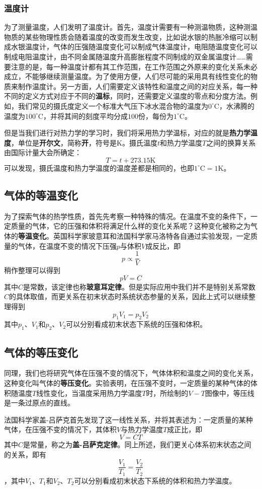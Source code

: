 \subsubsection{温度计}
为了测量温度，人们发明了温度计。首先，温度计需要有一种测温物质，这种测温物质的某些物理性质会随着温度的改变而发生改变，比如说水银的热胀冷缩可以制成水银温度计，气体的压强随温度变化可以制成气体温度计，电阻随温度变化可以制成电阻温度计，由不同金属随温度升高膨胀程度不同制成的双金属温度计……需要注意的是，每一种温度计都有其工作范围，在工作范围之外原来的变化关系未必成立，不能够继续测量温度。为了使用方便，人们尽可能的采用具有线性变化的物质来制作温度计。另一方面，人们需要定义该特性和温度之间的对应关系，每一种不同的定义方式对应于不同的\textbf{温标}，同时，还需要定义温度的零点和分度方法。例如，我们常见的摄氏度定义一个标准大气压下冰水混合物的温度为$0^\circ \mathrm{C}$，水沸腾的温度为$100^\circ \mathrm{C}$，并将其间的刻度平均分成$100$份，每份为$1^\circ \mathrm{C}$。

但是当我们进行对热力学的学习时，我们将采用热力学温标，对应的就是\textbf{热力学温度}，单位是\textbf{开尔文}，简称\textbf{开}，符号是$\mathrm{K}$。摄氏温度$t$和热力学温度$T$之间的换算关系由国际计量大会所确定：$$T=t+273.15\mathrm{K}$$可以发现，摄氏温度和热力学温度的温度差都是相同的，也即$1^\circ \mathrm{C}=1\mathrm{K}$。

\subsection{气体的等温变化}
为了探索气体的热学性质，首先先考察一种特殊的情况。在温度不变的条件下，一定质量的气体，它的压强和体积将满足什么样的变化关系呢？这种变化被称之为气体的\textbf{等温变化}。英国科学家玻意耳和法国科学家马洛特各自通过实验发现，一定质量的气体，在温度不变的情况下压强$p$与体积$V$成反比，即$$p\propto\dfrac{1}{V}$$稍作整理可以得到$$pV=C$$其中$C$是常数，该定律也称\textbf{玻意耳定律}。但是实际应用中我们并不是特别关系常数$C$的具体取值，而更关系在初末状态时系统状态参量的关系，因此上式可以继续整理得到$$p_1V_1=p_2V_2$$其中$p_1$、$V_1$和$p_2$、$V_2$可以分别看成初末状态下系统的压强和体积。
\subsection{气体的等压变化}
同理，我们也将研究气体在压强不变的情况下，气体体积和温度之间的变化关系，这种变化叫气体的\textbf{等压变化}。实验表明，在压强不变时，一定质量的某种气体的体积随温度$T$线性变化，当温度采用热力学温度$T$时，所绘制的$V-T$图像中，等压线是一条过原点的直线。

法国科学家盖-吕萨克首先发现了这一线性关系，并将其表述为：一定质量的某种气体，在压强不变的情况下，其体积$V$与热力学温度$T$成正比，即$$V=CT$$其中$C$是常量，称之为\textbf{盖-吕萨克定律}。同上所述，我们更关心体系初末状态之间的关系，即有$$\dfrac{V_1}{T_1}=\dfrac{V_2}{T_2}$$，其中$V_1$、$T_1$和$V_2$、$T_2$可以分别看成初末状态下系统的体积和热力学温度。

